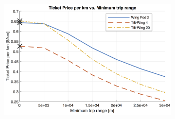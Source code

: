 \begin{figure}[H]
\begin{subfigure}[t]{0.33\textwidth}
\end{subfigure}
\begin{subfigure}[t]{0.33\textwidth}
    \centering
    \includegraphics[width=\textwidth]{Figures/minRange_TPrice_perkmNOPAD.png}
    \captionsetup{width=.8\linewidth}
    \caption{}
    \label{fig:sens3}
\end{subfigure}
\label{fig:sens123}
\end{figure}

